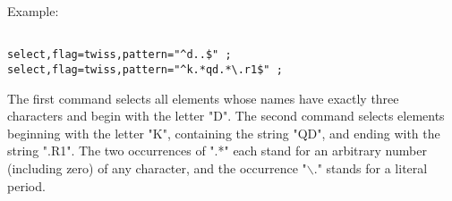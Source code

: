 Example: 
\begin{verbatim}

select,flag=twiss,pattern="^d..$" ;
select,flag=twiss,pattern="^k.*qd.*\.r1$" ;
\end{verbatim} 
The first command selects all elements whose names have exactly three
characters and begin with the letter "D". The second command selects
elements beginning with the letter "K", containing the string "QD", and
ending with the string ".R1". The two occurrences of ".*" each stand for
an arbitrary number (including zero) of any character, and the
occurrence "$\backslash$." stands for a literal period.  


